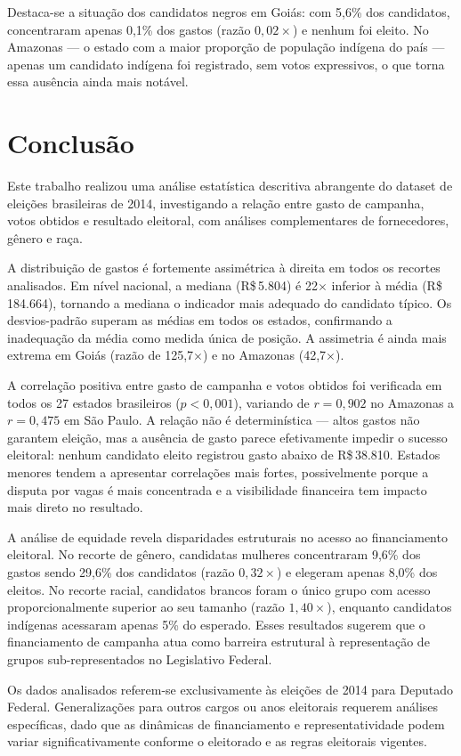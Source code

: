 \documentclass[conference]{IEEEtran}
\begin{document}
Destaca-se a situação dos candidatos negros em Goiás: com 5{,}6\% dos
candidatos, concentraram apenas 0{,}1\% dos gastos (razão $0{,}02\times$) e
nenhum foi eleito. No Amazonas --- o estado com a maior proporção de população
indígena do país --- apenas um candidato indígena foi registrado, sem votos
expressivos, o que torna essa ausência ainda mais notável.

\section{Conclusão}

Este trabalho realizou uma análise estatística descritiva abrangente do dataset
de eleições brasileiras de 2014, investigando a relação entre gasto de campanha,
votos obtidos e resultado eleitoral, com análises complementares de fornecedores,
gênero e raça.

A distribuição de gastos é fortemente assimétrica à direita em todos os recortes
analisados. Em nível nacional, a mediana (R\$\,5.804) é 22$\times$ inferior à
média (R\$\,184.664), tornando a mediana o indicador mais adequado do candidato
típico. Os desvios-padrão superam as médias em todos os estados, confirmando a
inadequação da média como medida única de posição. A assimetria é ainda mais
extrema em Goiás (razão de 125,7$\times$) e no Amazonas (42,7$\times$).

A correlação positiva entre gasto de campanha e votos obtidos foi verificada
em todos os 27 estados brasileiros ($p < 0{,}001$), variando de $r = 0{,}902$
no Amazonas a $r = 0{,}475$ em São Paulo. A relação não é determinística ---
altos gastos não garantem eleição, mas a ausência de gasto parece efetivamente
impedir o sucesso eleitoral: nenhum candidato eleito registrou gasto abaixo de
R\$\,38.810. Estados menores tendem a apresentar correlações mais fortes,
possivelmente porque a disputa por vagas é mais concentrada e a visibilidade
financeira tem impacto mais direto no resultado.

A análise de equidade revela disparidades estruturais no acesso ao financiamento
eleitoral. No recorte de gênero, candidatas mulheres concentraram 9{,}6\% dos
gastos sendo 29{,}6\% dos candidatos (razão $0{,}32\times$) e elegeram apenas
8{,}0\% dos eleitos. No recorte racial, candidatos brancos foram o único grupo
com acesso proporcionalmente superior ao seu tamanho (razão $1{,}40\times$),
enquanto candidatos indígenas acessaram apenas 5\% do esperado. Esses resultados
sugerem que o financiamento de campanha atua como barreira estrutural à
representação de grupos sub-representados no Legislativo Federal.

Os dados analisados referem-se exclusivamente às eleições de 2014 para Deputado
Federal. Generalizações para outros cargos ou anos eleitorais requerem análises
específicas, dado que as dinâmicas de financiamento e representatividade podem
variar significativamente conforme o eleitorado e as regras eleitorais vigentes.
\end{document}
